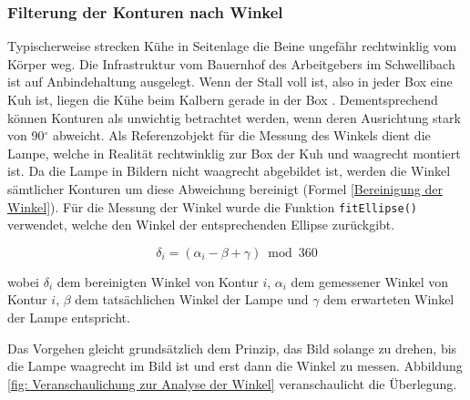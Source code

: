 \subsubsection{Filterung der Konturen nach Winkel}
Typischerweise strecken Kühe in Seitenlage die Beine ungefähr rechtwinklig vom Körper weg. Die Infrastruktur vom Bauernhof des Arbeitgebers im Schwellibach ist auf Anbindehaltung ausgelegt. Wenn der Stall voll ist, also in jeder Box eine Kuh ist, liegen die Kühe beim Kalbern gerade in der Box \citep{Muller2020b}. Dementsprechend können Konturen als unwichtig betrachtet werden, wenn deren Ausrichtung stark von 90$^{\circ}$  abweicht. Als Referenzobjekt für die Messung des Winkels dient die Lampe, welche in Realität rechtwinklig zur Box der Kuh und waagrecht montiert ist. Da die Lampe in Bildern nicht waagrecht abgebildet ist, werden die Winkel sämtlicher Konturen um diese Abweichung bereinigt (Formel \ref{Bereinigung der Winkel}). Für die Messung der Winkel wurde die Funktion \texttt{fitEllipse()} verwendet, welche den Winkel der entsprechenden Ellipse zurückgibt.

\begin{equation}\label{Bereinigung der Winkel}
\delta_{i} = (\alpha_{i} - \beta + \gamma) \bmod 360
\end{equation}

wobei $ \delta_{i} $ dem bereinigten Winkel von Kontur ${i}$,  $ \alpha_{i} $ dem gemessener Winkel von Kontur ${i}$, $\beta$ dem tatsächlichen Winkel der Lampe und $\gamma$ dem erwarteten Winkel der Lampe entspricht.


Das Vorgehen gleicht grundsätzlich dem Prinzip, das Bild solange zu drehen, bis die Lampe waagrecht im Bild ist und erst dann die Winkel zu messen. Abbildung \ref{fig: Veranschaulichung zur Analyse der Winkel} veranschaulicht die Überlegung. 


